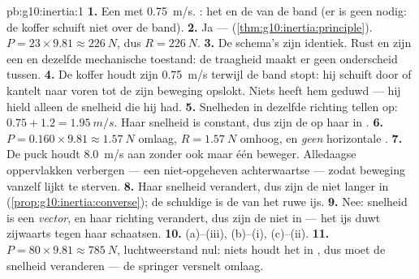 \begin{solution}{pb:g10:inertia:1}
\textbf{1.} Een  met \qty{0.75}{m/s}.
: het  en de  van de band (er is geen
 nodig: de koffer schuift niet over de band).
\textbf{2.} Ja --- 
(\cref{thm:g10:inertia:principle}). $P = 23 \times 9.81 \approx
\qty{226}{N}$, dus $R = \qty{226}{N}$.
\textbf{3.} De schema's zijn identiek. Rust en  zijn een en dezelfde mechanische toestand: de traagheid maakt
er geen onderscheid tussen.
\textbf{4.} De koffer houdt zijn \qty{0.75}{m/s} terwijl de band stopt:
hij schuift door of kantelt naar voren tot de  zijn beweging
opslokt. Niets heeft hem geduwd --- hij hield alleen de snelheid die hij
had.
\textbf{5.} Snelheden in dezelfde richting tellen op:
$0.75 + 1.2 = \qty{1.95}{m/s}$. Haar snelheid is constant, dus zijn de
 op haar in .
\textbf{6.} $P = 0.160 \times 9.81 \approx \qty{1.57}{N}$ omlaag,
$R = \qty{1.57}{N}$ omhoog, en \emph{geen} horizontale .
\textbf{7.} De puck houdt \qty{8.0}{m/s} aan zonder ook maar één
beweger. Alledaagse oppervlakken verbergen  --- een
niet-opgeheven achterwaartse  --- zodat beweging vanzelf lijkt te
sterven.
\textbf{8.} Haar snelheid verandert, dus zijn de  niet langer in
 (\cref{prop:g10:inertia:converse}); de schuldige is de
 van het ruwe ijs.
\textbf{9.} Nee: snelheid is een \emph{vector}, en haar richting
verandert, dus zijn de  niet in  --- het ijs duwt
zijwaarts tegen haar schaatsen.
\textbf{10.} (a)--(iii), (b)--(i), (c)--(ii).
\textbf{11.}  $P = 80 \times 9.81 \approx \qty{785}{N}$,
luchtweerstand nul: niets houdt het  in , dus moet de
snelheid veranderen --- de springer versnelt omlaag.

\end{solution}
